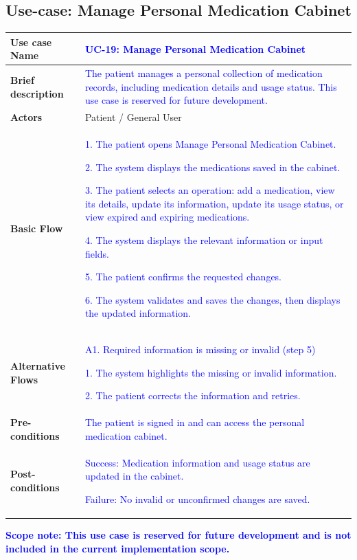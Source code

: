 \clearpage
\subsection{Use-case: Manage Personal Medication Cabinet}
\label{uc:uc-19}
\begin{longtable}{|p{}|p{}|}
\hline
\textbf{Use case Name} &
\textcolor{blue}{UC-19: Manage Personal Medication Cabinet}
\\ \hline
\textbf{Brief description} &
\textcolor{blue}{The patient manages a personal collection of medication records, including medication details and usage status. This use case is reserved for future development.}
\\ \hline
\textbf{Actors} &
Patient / General User
\\ \hline
\textbf{Basic Flow} &
\textcolor{blue}{1. The patient opens Manage Personal Medication Cabinet.}\par
\textcolor{blue}{2. The system displays the medications saved in the cabinet.}\par
\textcolor{blue}{3. The patient selects an operation: add a medication, view its details, update its information, update its usage status, or view expired and expiring medications.}\par
\textcolor{blue}{4. The system displays the relevant information or input fields.}\par
\textcolor{blue}{5. The patient confirms the requested changes.}\par
\textcolor{blue}{6. The system validates and saves the changes, then displays the updated information.}
\\ \hline
\textbf{Alternative Flows} &
\textcolor{blue}{A1. Required information is missing or invalid (step 5)}\par
\textcolor{blue}{1. The system highlights the missing or invalid information.}\par
\textcolor{blue}{2. The patient corrects the information and retries.}
\\ \hline
\textbf{Pre-conditions} &
\textcolor{blue}{The patient is signed in and can access the personal medication cabinet.}
\\ \hline
\textbf{Post-conditions} &
\textcolor{blue}{Success: Medication information and usage status are updated in the cabinet.}\par
\textcolor{blue}{Failure: No invalid or unconfirmed changes are saved.}
\\ \hline
\end{longtable}
\textcolor{blue}{\textbf{Scope note: This use case is reserved for future development and is not included in the current implementation scope.}}
\clearpage
